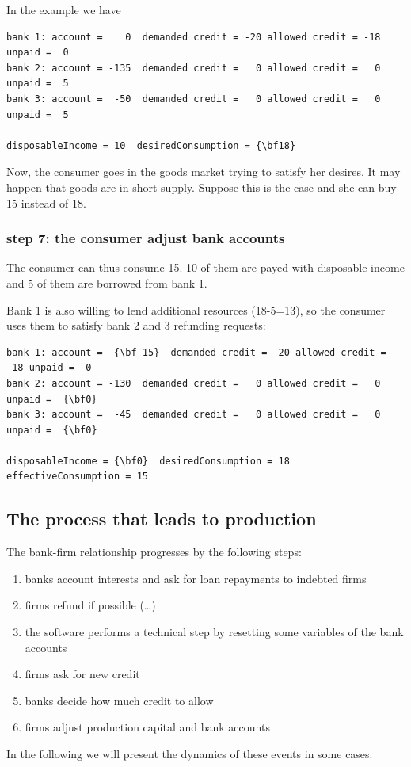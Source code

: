 \documentclass{article}
\begin{document}
In the example we have

\begin{Verbatim}[commandchars=\\\{\}]
bank 1: account =    0  demanded credit = -20 allowed credit = -18 unpaid =  0
bank 2: account = -135  demanded credit =   0 allowed credit =   0 unpaid =  5
bank 3: account =  -50  demanded credit =   0 allowed credit =   0 unpaid =  5

disposableIncome = 10  desiredConsumption = {\bf18}
\end{Verbatim}

Now, the consumer goes in the goods market trying to satisfy her desires. It may happen that goods are in short supply. Suppose this is the case and she can buy 15 instead of 18. 

\subsubsection*{step 7: the consumer adjust bank accounts}

The consumer can thus consume 15. 10 of them are payed with disposable income and 5 of them are borrowed from bank 1. 

Bank 1 is also willing to lend additional resources (18-5=13), so the consumer uses them to satisfy bank 2 and 3 refunding requests:

\begin{Verbatim}[commandchars=\\\{\}]
bank 1: account =  {\bf-15}  demanded credit = -20 allowed credit = -18 unpaid =  0
bank 2: account = -130  demanded credit =   0 allowed credit =   0 unpaid =  {\bf0}
bank 3: account =  -45  demanded credit =   0 allowed credit =   0 unpaid =  {\bf0}

disposableIncome = {\bf0}  desiredConsumption = 18 effectiveConsumption = 15
\end{Verbatim}


\newpage
\subsection{The process that leads to production}

The bank-firm relationship progresses by the following steps:

\begin{enumerate}
	\item banks account interests and ask for loan repayments to indebted firms
	\item firms refund if possible (\dots)
	\item the software performs a technical step by resetting some variables of the bank accounts
	\item firms ask for new credit
	\item banks decide how much credit to allow
	\item firms adjust production capital and bank accounts
\end{enumerate}
In the following we will present the dynamics of these events in some cases.
\end{document}
